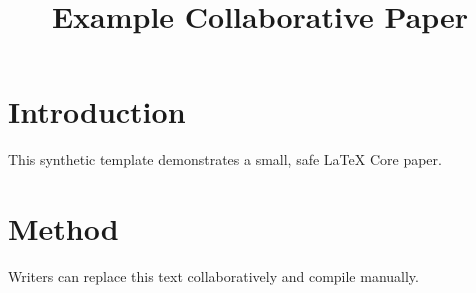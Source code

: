 \documentclass[11pt]{article}
\title{Example Collaborative Paper}
\begin{document}
\section{Introduction}
This synthetic template demonstrates a small, safe LaTeX Core paper.
\section{Method}
Writers can replace this text collaboratively and compile manually.
\end{document}
